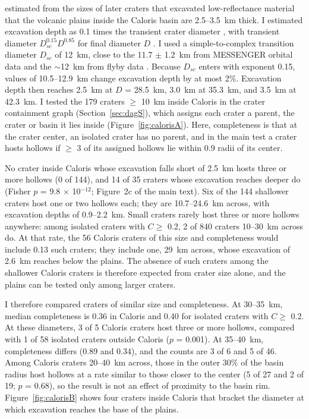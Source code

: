 \documentclass{planetary}
\begin{document}
\textcite{ernst2015} estimated from the sizes of later craters that excavated low-reflectance material that the volcanic plains inside the Caloris basin are 2.5--3.5~km thick. I estimated excavation depth as 0.1 times the transient crater diameter \parencite{melosh1989}, with transient diameter $D_{sc}^{0.15} D^{0.85}$ for final diameter $D$ \parencite{croft1985}. I used a simple-to-complex transition diameter $D_{sc}$ of 12~km, close to the 11.7 $\pm$ 1.2~km from MESSENGER orbital data \parencite{susorney2016} and the $\sim$12~km from flyby data \parencite{barnouin2012}. Because $D_{sc}$ enters with exponent 0.15, values of 10.5--12.9~km change excavation depth by at most 2\%. Excavation depth then reaches 2.5~km at $D$ = 28.5~km, 3.0~km at 35.3~km, and 3.5~km at 42.3~km. I tested the 179 craters $\geq$ 10~km inside Caloris in the crater containment graph (Section~\ref{sec:dagS}), which assigns each crater a parent, the crater or basin it lies inside (Figure~\ref{fig:calorisA}). Here, completeness is that at the crater center, an isolated crater has no parent, and in the main test a crater hosts hollows if $\geq$ 3 of its assigned hollows lie within 0.9 radii of its center.

No crater inside Caloris whose excavation falls short of 2.5~km hosts three or more hollows (0 of 144), and 14 of 35 craters whose excavation reaches deeper do (Fisher $p$ = 9.8 $\times$ 10$^{-12}$; Figure~2c of the main text). Six of the 144 shallower craters host one or two hollows each; they are 10.7--24.6~km across, with excavation depths of 0.9--2.2~km. Small craters rarely host three or more hollows anywhere: among isolated craters with $C \geq$ 0.2, 2 of 840 craters 10--30~km across do. At that rate, the 56 Caloris craters of this size and completeness would include 0.13 such craters; they include one, 29~km across, whose excavation of 2.6~km reaches below the plains. The absence of such craters among the shallower Caloris craters is therefore expected from crater size alone, and the plains can be tested only among larger craters.

I therefore compared craters of similar size and completeness. At 30--35~km, median completeness is 0.36 in Caloris and 0.40 for isolated craters with $C \geq$ 0.2. At these diameters, 3 of 5 Caloris craters host three or more hollows, compared with 1 of 58 isolated craters outside Caloris ($p$ = 0.001). At 35--40~km, completeness differs (0.89 and 0.34), and the counts are 3 of 6 and 5 of 46. Among Caloris craters 20--40~km across, those in the outer 30\% of the basin radius host hollows at a rate similar to those closer to the center (5 of 27 and 2 of 19; $p$ = 0.68), so the result is not an effect of proximity to the basin rim. Figure~\ref{fig:calorisB} shows four craters inside Caloris that bracket the diameter at which excavation reaches the base of the plains.
\end{document}
